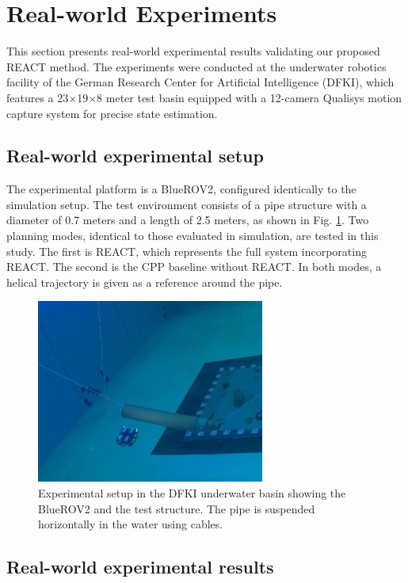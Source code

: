 \section{Real-world Experiments}
\label{sec:real-world}

This section presents real-world experimental results validating our proposed \ac{REACT} method. The experiments were conducted at the underwater robotics facility of the German Research Center for Artificial Intelligence (DFKI), which features a 23$\times$19$\times$8 meter test basin equipped with a 12-camera Qualisys motion capture system for precise state estimation.

\subsection{Real-world experimental setup}
The experimental platform is a BlueROV2, configured identically to the simulation setup. The test environment consists of a pipe structure with a diameter of 0.7 meters and a length of 2.5 meters, as shown in Fig. \ref{fig:pipe}. Two planning modes, identical to those evaluated in simulation, are tested in this study. The first is \ac{REACT}, which represents the full system incorporating \ac{REACT}. The second is the \ac{CPP} baseline without \ac{REACT}. In both modes, a helical trajectory is given as a reference around the pipe.

\begin{figure}[t]
    \centering
    \includegraphics[width=0.65\linewidth]{figures/dfki_pipe.jpeg}
    \caption{ Experimental setup in the DFKI underwater basin showing the BlueROV2 and the test structure. The pipe is suspended horizontally in the water using cables.}
    \label{fig:pipe}
\end{figure}

\subsection{Real-world experimental results}

